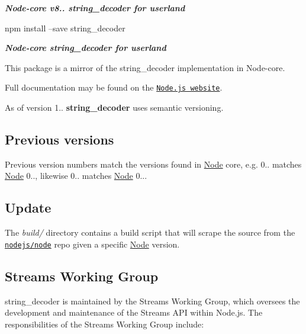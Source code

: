 {\itshape {\bfseries Node-\/core v8.. string\+\_\+decoder for userland}}

\href{https://nodei.co/npm/string_decoder/}{\tt } \href{https://nodei.co/npm/string_decoder/}{\tt }


\begin{DoxyCode}
npm install --save string\_decoder
\end{DoxyCode}


{\itshape {\bfseries Node-\/core string\+\_\+decoder for userland}}

This package is a mirror of the string\+\_\+decoder implementation in Node-\/core.

Full documentation may be found on the \href{https://nodejs.org/dist/v8.9.4/docs/api/}{\tt Node.\+js website}.

As of version 1.. {\bfseries string\+\_\+decoder} uses semantic versioning.

\subsection*{Previous versions}

Previous version numbers match the versions found in \mbox{\hyperlink{classNode}{Node}} core, e.\+g. 0.. matches \mbox{\hyperlink{classNode}{Node}} 0.., likewise 0.. matches \mbox{\hyperlink{classNode}{Node}} 0...

\subsection*{Update}

The {\itshape build/} directory contains a build script that will scrape the source from the \href{https://github.com/nodejs/node}{\tt nodejs/node} repo given a specific \mbox{\hyperlink{classNode}{Node}} version.

\subsection*{Streams Working Group}

{\ttfamily string\+\_\+decoder} is maintained by the Streams Working Group, which oversees the development and maintenance of the Streams A\+PI within Node.\+js. The responsibilities of the Streams Working Group include\+:


